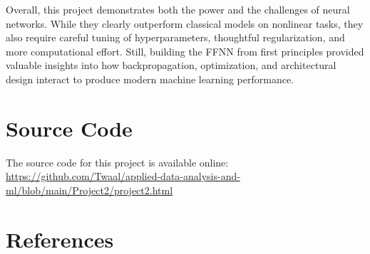 \documentclass[amssymb,twocolumn,aps]{revtex4}
\begin{document}
Overall, this project demonstrates both the power and the challenges of neural networks. While they clearly outperform classical models on nonlinear tasks, they also require careful tuning of hyperparameters, thoughtful regularization, and more computational effort. Still, building the FFNN from first principles provided valuable insights into how backpropagation, optimization, and architectural design interact to produce modern machine learning performance.


\appendix
\twocolumngrid %

\section{Source Code}\label{sec:source_code}

The source code for this project is available online: 
\url{https://github.com/Twaal/applied-data-analysis-and-ml/blob/main/Project2/project2.html}

\section{References}








\end{document}
